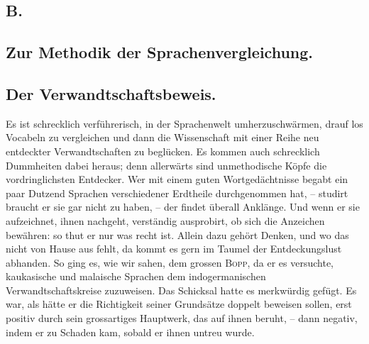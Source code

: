 \subsection*{B.}\label{III.I.I.2B}
\subsection*{Zur Methodik der Sprachenvergleichung.}
\subsection*{Der Verwandtschaftsbeweis.}
\begin{sloppypar}Es ist schrecklich verführerisch, in der Sprachenwelt umherzuschwärmen, drauf los Vocabeln zu vergleichen und dann die Wissenschaft mit einer Reihe neu entdeckter Verwandtschaften zu beglücken. Es kom\label{fp.165}men auch schrecklich  Dummheiten dabei heraus; denn allerwärts sind unmethodische Köpfe die vordringlichsten Entdecker. Wer mit einem guten Wortgedächtnisse begabt ein paar Dutzend Sprachen verschiedener Erdtheile durchgenommen hat, – studirt \label{sp.155} braucht er sie gar nicht zu haben, – der findet überall Anklänge. Und wenn er sie aufzeichnet, ihnen nachgeht, verständig ausprobirt, ob sich die Anzeichen bewähren: so thut er nur was recht ist. Allein dazu gehört  Denken, und wo das nicht von Hause aus fehlt, da kommt es gern im Taumel der Entdeckungslust abhanden. So ging es, wie wir sahen, dem grossen \textsc{Bopp}, da er es versuchte, kaukasische und malaische Sprachen dem indogermanischen Verwandtschaftskreise zuzuweisen. Das Schicksal hatte es merkwürdig gefügt. Es war, als hätte er die Richtigkeit seiner Grundsätze doppelt beweisen sollen, erst positiv durch sein grossartiges Hauptwerk, das auf ihnen beruht, – dann negativ, indem er zu Schaden kam, sobald er ihnen untreu wurde.\end{sloppypar}

